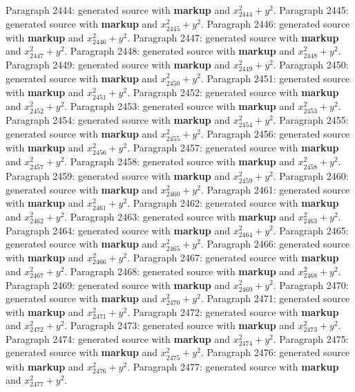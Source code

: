 \documentclass{article}
\begin{document}
Paragraph 2444: generated source with \textbf{markup} and $x_{2444}^2 + y^2$.
Paragraph 2445: generated source with \textbf{markup} and $x_{2445}^2 + y^2$.
Paragraph 2446: generated source with \textbf{markup} and $x_{2446}^2 + y^2$.
Paragraph 2447: generated source with \textbf{markup} and $x_{2447}^2 + y^2$.
Paragraph 2448: generated source with \textbf{markup} and $x_{2448}^2 + y^2$.
Paragraph 2449: generated source with \textbf{markup} and $x_{2449}^2 + y^2$.
Paragraph 2450: generated source with \textbf{markup} and $x_{2450}^2 + y^2$.
Paragraph 2451: generated source with \textbf{markup} and $x_{2451}^2 + y^2$.
Paragraph 2452: generated source with \textbf{markup} and $x_{2452}^2 + y^2$.
Paragraph 2453: generated source with \textbf{markup} and $x_{2453}^2 + y^2$.
Paragraph 2454: generated source with \textbf{markup} and $x_{2454}^2 + y^2$.
Paragraph 2455: generated source with \textbf{markup} and $x_{2455}^2 + y^2$.
Paragraph 2456: generated source with \textbf{markup} and $x_{2456}^2 + y^2$.
Paragraph 2457: generated source with \textbf{markup} and $x_{2457}^2 + y^2$.
Paragraph 2458: generated source with \textbf{markup} and $x_{2458}^2 + y^2$.
Paragraph 2459: generated source with \textbf{markup} and $x_{2459}^2 + y^2$.
Paragraph 2460: generated source with \textbf{markup} and $x_{2460}^2 + y^2$.
Paragraph 2461: generated source with \textbf{markup} and $x_{2461}^2 + y^2$.
Paragraph 2462: generated source with \textbf{markup} and $x_{2462}^2 + y^2$.
Paragraph 2463: generated source with \textbf{markup} and $x_{2463}^2 + y^2$.
Paragraph 2464: generated source with \textbf{markup} and $x_{2464}^2 + y^2$.
Paragraph 2465: generated source with \textbf{markup} and $x_{2465}^2 + y^2$.
Paragraph 2466: generated source with \textbf{markup} and $x_{2466}^2 + y^2$.
Paragraph 2467: generated source with \textbf{markup} and $x_{2467}^2 + y^2$.
Paragraph 2468: generated source with \textbf{markup} and $x_{2468}^2 + y^2$.
Paragraph 2469: generated source with \textbf{markup} and $x_{2469}^2 + y^2$.
Paragraph 2470: generated source with \textbf{markup} and $x_{2470}^2 + y^2$.
Paragraph 2471: generated source with \textbf{markup} and $x_{2471}^2 + y^2$.
Paragraph 2472: generated source with \textbf{markup} and $x_{2472}^2 + y^2$.
Paragraph 2473: generated source with \textbf{markup} and $x_{2473}^2 + y^2$.
Paragraph 2474: generated source with \textbf{markup} and $x_{2474}^2 + y^2$.
Paragraph 2475: generated source with \textbf{markup} and $x_{2475}^2 + y^2$.
Paragraph 2476: generated source with \textbf{markup} and $x_{2476}^2 + y^2$.
Paragraph 2477: generated source with \textbf{markup} and $x_{2477}^2 + y^2$.
\end{document}

